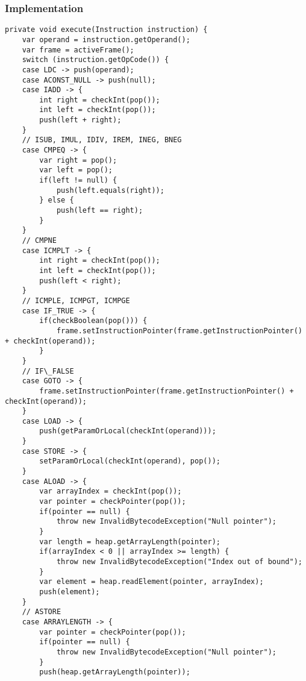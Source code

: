 \subsubsection{Implementation}
\begin{lstlisting}
private void execute(Instruction instruction) {
    var operand = instruction.getOperand();
    var frame = activeFrame();
    switch (instruction.getOpCode()) {
    case LDC -> push(operand);
    case ACONST_NULL -> push(null);
    case IADD -> {
        int right = checkInt(pop());
        int left = checkInt(pop());
        push(left + right);
    }
    // ISUB, IMUL, IDIV, IREM, INEG, BNEG
    case CMPEQ -> {
        var right = pop();
        var left = pop();
        if(left != null) {
            push(left.equals(right));
        } else {
            push(left == right);
        }
    }
    // CMPNE
    case ICMPLT -> {
        int right = checkInt(pop());
        int left = checkInt(pop());
        push(left < right);
    }
    // ICMPLE, ICMPGT, ICMPGE
    case IF_TRUE -> {
        if(checkBoolean(pop())) {
            frame.setInstructionPointer(frame.getInstructionPointer() + checkInt(operand));
        }
    }
    // IF\_FALSE
    case GOTO -> {
        frame.setInstructionPointer(frame.getInstructionPointer() + checkInt(operand));
    }
    case LOAD -> {
        push(getParamOrLocal(checkInt(operand))); 
    }
    case STORE -> {
        setParamOrLocal(checkInt(operand), pop());
    }
    case ALOAD -> {
        var arrayIndex = checkInt(pop());
        var pointer = checkPointer(pop());
        if(pointer == null) {
            throw new InvalidBytecodeException("Null pointer");
        }
        var length = heap.getArrayLength(pointer);
        if(arrayIndex < 0 || arrayIndex >= length) {
            throw new InvalidBytecodeException("Index out of bound");
        }
        var element = heap.readElement(pointer, arrayIndex);
        push(element);
    }
    // ASTORE
    case ARRAYLENGTH -> {
        var pointer = checkPointer(pop());
        if(pointer == null) {
            throw new InvalidBytecodeException("Null pointer");
        }
        push(heap.getArrayLength(pointer));
        

\end{lstlisting}
